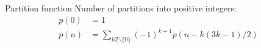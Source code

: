 \begin{misc}{Partition function}
	Number of partitions into positive integers:
	\begin{align*}
		p(0) &= 1 \\
		p(n) &= \sum_{k \mathbb{Z} \setminus \{0\}} (-1)^{k+1} p(n - k(3k-1)/2)
	\end{align*}
\end{misc}





